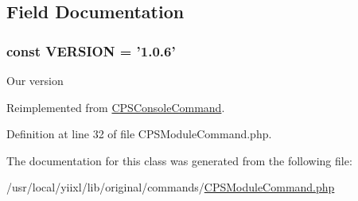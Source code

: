 \subsection{Field Documentation}
\hypertarget{classCPSModuleCommand_af71005841ce53adac00581ab0ba24c1f}{
\subsubsection[{VERSION}]{\setlength{\rightskip}{0pt plus 5cm}const {\bf VERSION} = '1.0.6'}}
\label{classCPSModuleCommand_af71005841ce53adac00581ab0ba24c1f}
Our version 

Reimplemented from \hyperlink{classCPSConsoleCommand_af71005841ce53adac00581ab0ba24c1f}{CPSConsoleCommand}.



Definition at line 32 of file CPSModuleCommand.php.



The documentation for this class was generated from the following file:\begin{DoxyCompactItemize}
\item 
/usr/local/yiixl/lib/original/commands/\hyperlink{CPSModuleCommand_8php}{CPSModuleCommand.php}\end{DoxyCompactItemize}
